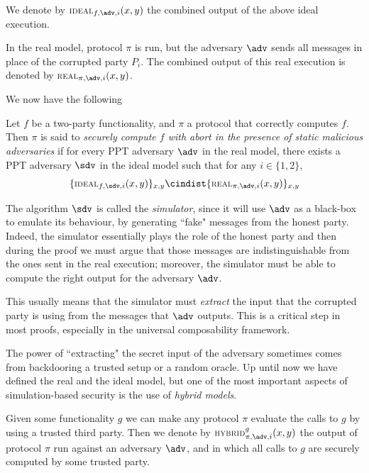 We denote by $\textsc{\scriptsize IDEAL}_{f,\adv,i}(x,y)$ the combined output of the above ideal execution.

In the real model, protocol $\pi$ is run, but the adversary $\adv$ sends all messages in place of the corrupted party $P_i$. The combined output of this real execution is denoted by $\textsc{\scriptsize REAL}_{\pi,\adv,i}(x,y)$.

We now have the following
\begin{definition}
    Let $f$ be a two-party functionality, and $\pi$ a protocol that correctly computes $f$. Then $\pi$ is said to \emph{securely compute $f$ with abort in the presence of static malicious adversaries} if for every PPT adversary $\adv$ in the real model, there exists a PPT adversary $\sdv$ in the ideal model such that for any $i\in\{1,2\}$,
    $$ \{ \textsc{\scriptsize IDEAL}_{f,\sdv,i}(x,y) \}_{x,y} \cindist \{ \textsc{\scriptsize REAL}_{\pi,\adv,i}(x,y) \}_{x,y}$$
\end{definition}

The algorithm $\sdv$ is called the \emph{simulator}, since it will use $\adv$ as a black-box to emulate its behaviour, by generating ``fake" messages from the honest party. Indeed, the simulator essentially plays the role of the honest party and then during the proof we must argue that those messages are indistinguishable from the ones sent in the real execution; moreover, the simulator must be able to compute the right output for the adversary $\adv$.

This usually means that the simulator must \emph{extract} the input that the corrupted party is using from the messages that $\adv$ outputs. This is a critical step in most proofs, especially in the universal composability framework.

The power of ``extracting" the secret input of the adversary sometimes comes from backdooring a trusted setup or a random oracle. Up until now we have defined the real and the ideal model, but one of the most important aspects of simulation-based security is the use of \emph{hybrid models}.

Given some functionality $g$ we can make any protocol $\pi$ evaluate the calls to $g$ by using a trusted third party. Then we denote by $\textsc{\scriptsize HYBRID}^g_{\pi,\adv,i}(x,y)$ the output of protocol $\pi$ run against an adversary $\adv$, and in which all calls to $g$ are securely computed by some trusted party.

